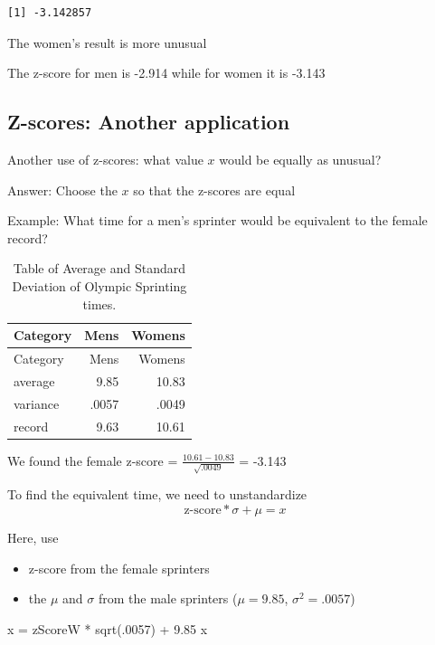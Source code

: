 \documentclass[
  letterpaper,
  DIV=11,
  numbers=noendperiod]{scrartcl}
\newenvironment{Shaded}{\begin{snugshade}}{\end{snugshade}}
\newcommand{\DecValTok}[1]{\textcolor[rgb]{0.68,0.00,0.00}{#1}}
\newcommand{\FloatTok}[1]{\textcolor[rgb]{0.68,0.00,0.00}{#1}}
\newcommand{\FunctionTok}[1]{\textcolor[rgb]{0.28,0.35,0.67}{#1}}
\newcommand{\NormalTok}[1]{\textcolor[rgb]{0.00,0.23,0.31}{#1}}
\newcommand{\OtherTok}[1]{\textcolor[rgb]{0.00,0.23,0.31}{#1}}
\newcommand{\SpecialCharTok}[1]{\textcolor[rgb]{0.37,0.37,0.37}{#1}}
\providecommand{\tightlist}{%
  \setlength{\itemsep}{0pt}\setlength{\parskip}{0pt}}
\begin{document}
\begin{verbatim}
[1] -3.142857
\end{verbatim}

The women's result is more unusual

The z-score for men is -2.914 while for women it is -3.143

\subsection{Z-scores: Another
application}\label{z-scores-another-application}

Another use of {z-scores}: what value \(x\) would be equally as unusual?

{Answer:} Choose the \(x\) so that the z-scores are {equal}

{Example:} What time for a men's sprinter would be equivalent to the
female record?

\begin{longtable}[]{@{}lrr@{}}
\caption{Table of Average and Standard Deviation of Olympic Sprinting
times.}\tabularnewline
\toprule\noalign{}
Category & Mens & Womens \\
\midrule\noalign{}
\endfirsthead
\toprule\noalign{}
Category & Mens & Womens \\
\midrule\noalign{}
\endhead
\bottomrule\noalign{}
\endlastfoot
average & 9.85 & 10.83 \\
variance & .0057 & .0049 \\
record & 9.63 & 10.61 \\
\end{longtable}

We found the female z-score = \(\frac{10.61 - 10.83}{\sqrt{.0049}}\) =
-3.143

To find the equivalent time, we need to {unstandardize} \[
\text{z-score}*\sigma  + \mu = x
\]

Here, use

\begin{itemize}
\tightlist
\item
  z-score from the female sprinters
\item
  the \(\mu\) and \(\sigma\) from the male sprinters (\(\mu = 9.85\),
  \(\sigma^2 = .0057\))
\end{itemize}

\begin{Shaded}
\begin{Highlighting}[]
\NormalTok{x }\OtherTok{=}\NormalTok{ zScoreW }\SpecialCharTok{*} \FunctionTok{sqrt}\NormalTok{(.}\DecValTok{0057}\NormalTok{) }\SpecialCharTok{+} \FloatTok{9.85}
\NormalTok{x}
\end{Highlighting}
\end{Shaded}
\end{document}
